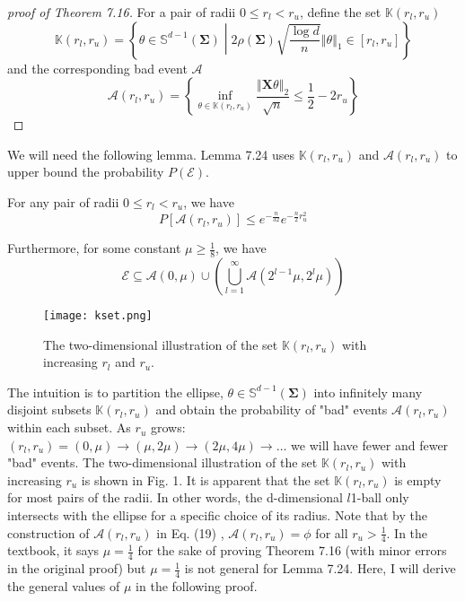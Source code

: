\documentclass[a4paper, 11pt]{article}
\begin{document}
\begin{proof}[proof of Theorem 7.16]
For a pair of radii $0\leq r_l < r_u$, define the set $\mathbb{K}(r_l, r_u)$
\begin{equation}
\mathbb{K}(r_l, r_u) = \left\{ \theta\in\mathbb{S}^{d-1}(\mathbf{\Sigma}) \middle| 2\rho(\mathbf{\Sigma})\sqrt{\frac{\log d}{n}}\left\Vert\theta \right\Vert_1\in\left[r_l, r_u \right]\right\}
\end{equation}
and the corresponding bad event $\mathcal{A}$ 
\begin{equation}
\mathcal{A}(r_l, r_u) = \left\{\inf_{\theta\in\mathbb{K}(r_l, r_u)}\frac{\left\Vert\mathbf{X}\theta \right\Vert_2}{\sqrt{n}}\leq \frac{1}{2}-2r_u \right\}
\end{equation}
\end{proof}

We will need the following lemma. Lemma 7.24 uses $\mathbb{K}(r_l, r_u)$ and $\mathcal{A}(r_l, r_u)$ to upper bound the probability $P(\mathcal{E})$. 



\begin{customlemma}{7.24}
For any pair of radii $0\leq r_l<r_u$, we have 
\begin{equation}
P\left[\mathcal{A}(r_l, r_u)\right] \leq e^{-\frac{n}{32}}e^{-\frac{n}{2}r_u^2}
\end{equation}

Furthermore, for some constant $\mu\geq \frac{1}{8}$, we have
\begin{equation}
\mathcal{E} \subseteq \mathcal{A}(0, \mu) \cup \left(\bigcup_{l=1}^\infty \mathcal{A}(2^{l-1}\mu, 2^l\mu) \right)
\end{equation}
\end{customlemma}

\begin{figure}
  \centering
  \texttt{[image: kset.png]}
  \caption{The two-dimensional illustration of the set $\mathbb{K}(r_l, r_u)$ with increasing $r_l$ and $r_u$. }
  \label{fig:kset}
\end{figure}

The intuition is to partition the ellipse, $\theta\in\mathbb{S}^{d-1}(\mathbf{\Sigma})$ into infinitely many disjoint subsets $\mathbb{K}(r_l, r_u)$ and obtain the probability of "bad" events $\mathcal{A}(r_l, r_u)$ within each subset. As $r_u$ grows: $(r_l, r_u) = (0, \mu)\to(\mu, 2\mu)\to(2\mu, 4\mu)\to\dots$ we will have fewer and fewer "bad" events. The two-dimensional illustration of the set $\mathbb{K}(r_l, r_u)$ with increasing $r_u$ is shown in Fig. 1. It is apparent that the set $\mathbb{K}(r_l, r_u)$ is empty for most pairs of the radii. In other words, the d-dimensional $l$1-ball only intersects with the ellipse for a specific choice of its radius. Note that by the construction of $\mathcal{A}(r_l, r_u)$ in Eq. (19) , $\mathcal{A}(r_l, r_u) = \phi$ for all $r_u > \frac{1}{4}$. In the textbook, it says $\mu = \frac{1}{4}$ for the sake of proving Theorem 7.16 (with minor errors in the original proof) but $\mu=\frac{1}{4}$ is not general for Lemma 7.24. Here, I will derive the general values of $\mu$ in the following proof. 
\end{document}
